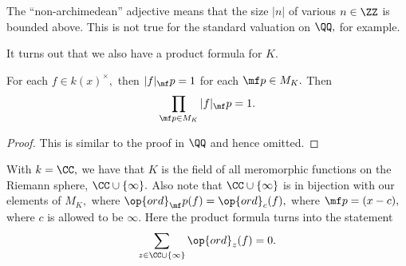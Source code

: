\documentclass[../notes.tex]{subfiles}
\begin{document}
\begin{remark}
	The ``non-archimedean'' adjective means that the size $|n|$ of various $n\in\ZZ$ is bounded above. This is not true for the standard valuation on $\QQ,$ for example.
\end{remark}
It turns out that we also have a product formula for $K.$
\begin{theorem}
	For each $f\in k(x)^\times,$ then $|f|_\mf p=1$ for each $\mf p\in M_K.$ Then
	\[\prod_{\mf p\in M_K}|f|_\mf p=1.\]
\end{theorem}
\begin{proof}
	This is similar to the proof in $\QQ$ and hence omitted.
\end{proof}
\begin{example}
	With $k=\CC,$ we have that $K$ is the field of all meromorphic functions on the Riemann sphere, $\CC\cup\{\infty\}.$ Also note that $\CC\cup\{\infty\}$ is in bijection with our elements of $M_K,$ where $\op{ord}_\mf p(f)=\op{ord}_c(f),$ where $\mf p=(x-c),$ where $c$ is allowed to be $\infty.$ Here the product formula turns into the statement
	\[\sum_{z\in\CC\cup\{\infty\}}\op{ord}_z(f)=0.\]
\end{example}
\end{document}
